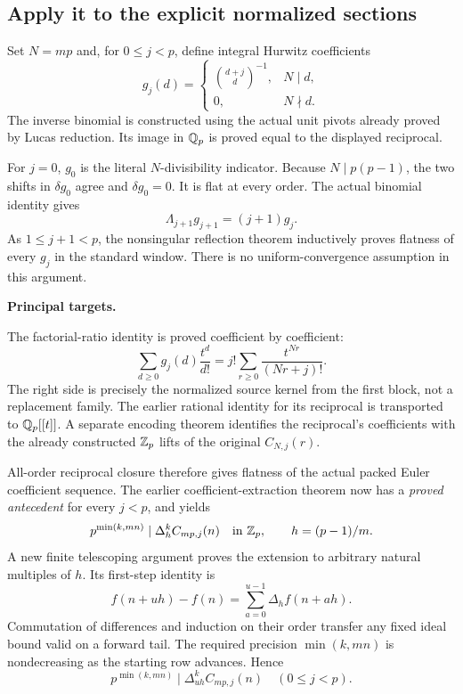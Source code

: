 \subsection*{Apply it to the explicit normalized sections}
Set $N=mp$ and, for $0\le j<p$, define integral Hurwitz coefficients
\[
 g_j(d)=
 \begin{cases}
 \displaystyle\binom{d+j}{d}^{-1},&N\mid d,\\[1mm]
 0,&N\nmid d.
 \end{cases}
\]
The inverse binomial is constructed using the actual unit pivots already proved by Lucas reduction. Its image in $\mathbb Q_p$ is proved equal to the displayed reciprocal.

For $j=0$, $g_0$ is the literal $N$-divisibility indicator. Because $N\mid p(p-1)$, the two shifts in $\delta g_0$ agree and $\delta g_0=0$. It is flat at every order. The actual binomial identity gives
\[
 \Lambda_{j+1}g_{j+1}=(j+1)g_j.
\]
As $1\le j+1<p$, the nonsingular reflection theorem inductively proves flatness of every $g_j$ in the standard window. There is no uniform-convergence assumption in this argument.

\textbf{Principal targets.}\par
{}\par
{}\par
{}

\par\medskip
{}
The factorial-ratio identity is proved coefficient by coefficient:
\[
 \sum_{d\ge0}g_j(d)\frac{t^d}{d!}
 =j!\sum_{r\ge0}\frac{t^{Nr}}{(Nr+j)!}.
\]
The right side is precisely the normalized source kernel from the first block, not a replacement family. The earlier rational identity for its reciprocal is transported to $\mathbb Q_p[[t]]$. A separate encoding theorem identifies the reciprocal's coefficients with the already constructed $\mathbb Z_p$ lifts of the original $C_{N,j}(r)$.

All-order reciprocal closure therefore gives flatness of the actual packed Euler coefficient sequence. The earlier coefficient-extraction theorem now has a \emph{proved antecedent} for every $j<p$, and yields
\[
 p^{\min(k,mn)}\mid\Delta_h^k C_{mp,j}(n)\quad\text{in }\mathbb Z_p,
 \qquad h=(p-1)/m.
\]
A new finite telescoping argument proves the extension to arbitrary natural multiples of $h$. Its first-step identity is
\[
 f(n+uh)-f(n)=\sum_{a=0}^{u-1}\Delta_h f(n+ah).
\]
Commutation of differences and induction on their order transfer any fixed ideal bound valid on a forward tail. The required precision $\min(k,mn)$ is nondecreasing as the starting row advances. Hence
\[
 \boxed{p^{\min(k,mn)}\mid\Delta_{uh}^{k}C_{mp,j}(n)\quad(0\le j<p).}
\]

